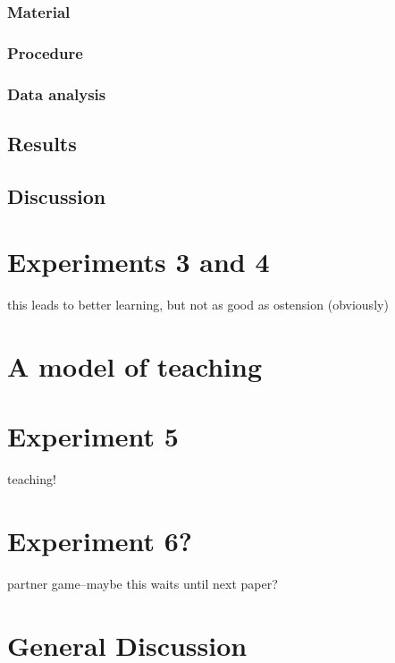 \documentclass[english,floatsintext,man]{apa6}
\theoremstyle{definition}
\theoremstyle{definition}
\theoremstyle{definition}
\theoremstyle{remark}
\begin{document}
\subsubsection{Material}\label{material}

\subsubsection{Procedure}\label{procedure}

\subsubsection{Data analysis}\label{data-analysis}

\subsection{Results}\label{results}

\subsection{Discussion}\label{discussion}

\section{Experiments 3 and 4}\label{experiments-3-and-4}

this leads to better learning, but not as good as ostension (obviously)

\section{A model of teaching}\label{a-model-of-teaching}

\section{Experiment 5}\label{experiment-5}

teaching!

\section{Experiment 6?}\label{experiment-6}

partner game--maybe this waits until next paper?

\section{General Discussion}\label{general-discussion}
\end{document}
